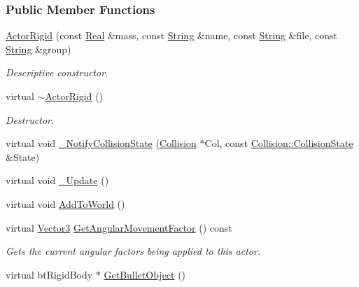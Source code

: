 \subsubsection*{Public Member Functions}
\begin{DoxyCompactItemize}
\item 
\hyperlink{classMezzanine_1_1ActorRigid_a6ac6b311067103713cf6cb41fe4810c7}{ActorRigid} (const \hyperlink{namespaceMezzanine_a726731b1a7df72bf3583e4a97282c6f6}{Real} \&mass, const \hyperlink{namespaceMezzanine_acf9fcc130e6ebf08e3d8491aebcf1c86}{String} \&name, const \hyperlink{namespaceMezzanine_acf9fcc130e6ebf08e3d8491aebcf1c86}{String} \&file, const \hyperlink{namespaceMezzanine_acf9fcc130e6ebf08e3d8491aebcf1c86}{String} \&group)
\begin{DoxyCompactList}\small\item\em Descriptive constructor. \item\end{DoxyCompactList}\item 
virtual \hyperlink{classMezzanine_1_1ActorRigid_a8898e2d624ca89e3bc27dadfbc78560b}{$\sim$ActorRigid} ()
\begin{DoxyCompactList}\small\item\em Destructor. \item\end{DoxyCompactList}\item 
virtual void \hyperlink{classMezzanine_1_1ActorRigid_a68827280395bc3b9e0266710ec44247d}{\_\-NotifyCollisionState} (\hyperlink{classMezzanine_1_1Collision}{Collision} $\ast$Col, const \hyperlink{classMezzanine_1_1Collision_a24094c597061743dcd571f36077f4d19}{Collision::CollisionState} \&State)
\item 
virtual void \hyperlink{classMezzanine_1_1ActorRigid_a714d836a18ddb4de65bec5afdfdbb81c}{\_\-Update} ()
\item 
virtual void \hyperlink{classMezzanine_1_1ActorRigid_a5934a8751b9ec19dd2cd9327ce651d59}{AddToWorld} ()
\item 
virtual \hyperlink{classMezzanine_1_1Vector3}{Vector3} \hyperlink{classMezzanine_1_1ActorRigid_ac2b338b867bfd7d2e322a834e308a957}{GetAngularMovementFactor} () const 
\begin{DoxyCompactList}\small\item\em Gets the current angular factors being applied to this actor. \item\end{DoxyCompactList}\item 
virtual btRigidBody $\ast$ \hyperlink{classMezzanine_1_1ActorRigid_aec84029880e2cebf3cc154ada813a372}{GetBulletObject} ()

\end{DoxyCompactItemize}
